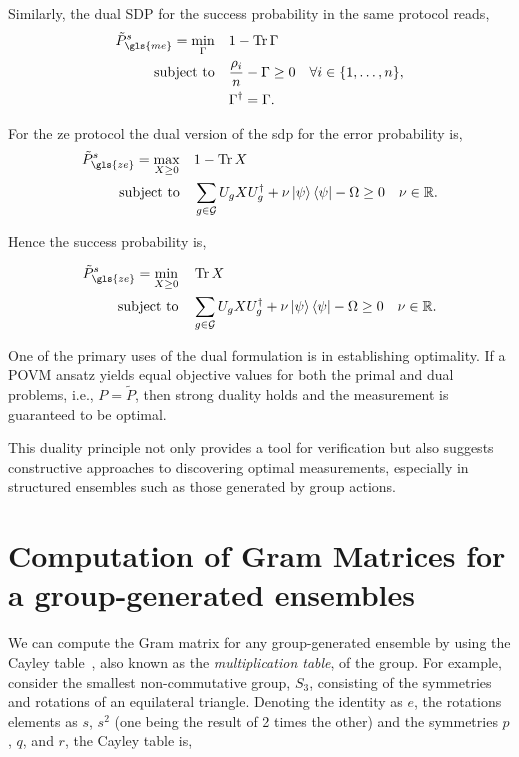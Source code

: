 \documentclass[12pt,letterpaper]{article}
\DeclareMathOperator{\tr}{Tr}
\begin{document}
Similarly, the dual SDP for the success probability in the same protocol reads,
\begin{align*}
	\tilde{P}_{\gls{me}}^s = \min_{\Gamma} \quad & 1 - \tr{\Gamma} \\
	\text{subject to} \quad & \frac{\rho_i}{n} - \Gamma \geq 0 \quad \forall i \in \{1, \dots, n\}, \\
	& \Gamma^\dagger = \Gamma.
\end{align*}

For the \gls{ze} protocol the dual version of the \gls{sdp} for the error probability is,
\begin{align*}
	\tilde{P}_{\gls{ze}}^s = \max_{X\geq 0} \quad & 1-\tr{X} \\
	\text{subject to} \quad & \sum_{g\in\mathcal{G}}U_gXU_g^\dagger+ \nu\ket{\psi}\bra{\psi}-\Omega \geq 0 \quad \nu \in \mathbb{R}.
\end{align*}

Hence the success probability is,

\begin{align*}
	\tilde{P}_{\gls{ze}}^s = \min_{X\geq 0} \quad & \tr{X} \\
	\text{subject to} \quad & \sum_{g\in\mathcal{G}}U_gXU_g^\dagger+ \nu\ket{\psi}\bra{\psi}-\Omega \geq 0 \quad \nu \in \mathbb{R}.
\end{align*}

One of the primary uses of the dual formulation is in establishing optimality. If a POVM ansatz yields equal objective values for both the primal and dual problems, i.e., $P = \tilde{P}$, then strong duality holds and the measurement is guaranteed to be optimal.

This duality principle not only provides a tool for verification but also suggests constructive approaches to discovering optimal measurements, especially in structured ensembles such as those generated by group actions.

\section{Computation of Gram Matrices for a group-generated ensembles}\label{appendixComputationGroupGeneratedGramMatrices}

We can compute the Gram matrix for any group-generated ensemble by using the Cayley table~\cite{CayleyTable}, also known as the \emph{multiplication table}, of the group. For example, consider the smallest non-commutative group, $S_3$, consisting of the symmetries and rotations of an equilateral triangle. Denoting the identity as $e$, the rotations elements as $s$, $s^2$ (one being the result of 2 times the other) and the symmetries $p$, $q$, and $r$, the Cayley table is,
\end{document}
